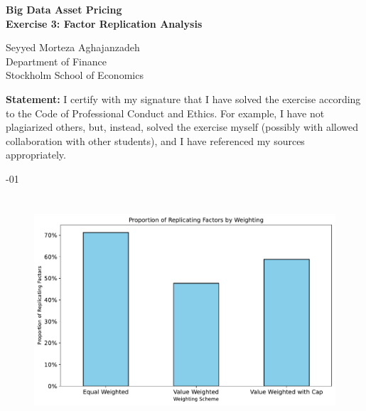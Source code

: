 \documentclass[hidelinks,12pt]{article}
\begin{document}
\begin{titlepage}
    \begin{center}
        \vspace*{1cm}
        
        
        
        \large
        \textbf{Big Data Asset Pricing \\ Exercise 3: Factor Replication Analysis}
            
        
        \normalsize
        Seyyed Morteza Aghajanzadeh \\
        Department of Finance \\
        Stockholm School of Economics
        
        \vfill
        \normalsize
        \justifying
        \noindent
        \textbf{Statement:} I certify with my signature that I have solved the exercise according to the Code of Professional Conduct and Ethics. 
        For example, I have not plagiarized others, but, instead, solved the exercise myself (possibly with allowed collaboration with other students), and I have referenced my sources appropriately.

        \vfill
        
        \vspace{0.8cm}
            
        
        \vspace{0.8cm}
        \normalsize
        -01
            
    \end{center}
\end{titlepage}

\section{}

\begin{figure}[htbp]
    \centering
    \includegraphics[width=.95\textwidth]{out/1.pdf}
\end{figure}
\end{document}
